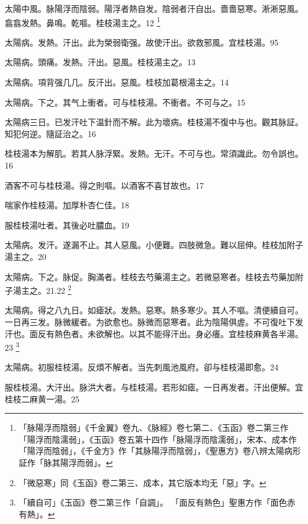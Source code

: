 太陽中風。{\khaaitp 脉}陽浮而陰弱。陽浮者熱自发。陰弱者汗自出。嗇嗇惡寒。淅淅惡風。翕翕发熱。鼻鳴。乾嘔。桂枝湯主之。12
	\footnote{
		「脉陽浮而陰弱」《千金翼》卷九、《脉經》卷七第二、《玉函》卷二第三作「陽浮而陰濡弱」，《玉函》卷五第十四作「脉陽浮而陰濡弱」，宋本、成本作「陽浮而陰弱」，《千金方》作「其脉陽浮而陰弱」，《聖惠方》卷八辨太陽病形証作「脉其陽浮而弱」。
	}

太陽病。发熱。汗出。此为榮弱衛强。故使汗出。欲救邪風。宜桂枝湯。95

太陽病。頭痛。发熱。汗出。惡風。桂枝湯主之。13

太陽病。項背强几几。反汗出。惡風。桂枝{\khaaitp 加葛根}湯主之。14

太陽病。下之。其气上衝者。可与桂枝湯。不衝者。不可与之。15

太陽病三日。已发汗吐下温針而不解。此为壞病。桂枝湯不復中与也。觀其脉証。知犯何逆。隨証治之。16

桂枝湯本为解肌。若其人脉浮緊。发熱。无汗。不可与也。常須識此。勿令誤也。16

酒客不可与桂枝湯。得之則嘔。以酒客不喜甘故也。17

喘家作桂枝湯。加厚朴杏仁佳。18

服桂枝湯吐者。其後必吐膿血。19

太陽病。发汗。遂漏不止。其人惡風。小便難。四肢微急。難以屈伸。桂枝加附子湯主之。20

太陽病。下之。脉促。胸滿者。桂枝去芍藥湯主之。若微{\khaaitp 惡}寒者。桂枝去芍藥加附子湯主之。21.22
	\footnote{
		「微惡寒」同《玉函》卷二第三、成本，其它版本均无「惡」字。
	}

太陽病。得之八九日。如瘧狀。发熱。惡寒。熱多寒少。其人不嘔。清便續自可。一日再三发。脉微緩者。为欲愈也。脉微而惡寒者。此为陰陽俱虗。不可復{\khaaitp 吐下}发汗也。面反有熱色者。未欲解也。以其不能得汗出。身必癢。宜桂枝麻黄各半湯。23
	\footnote{
		「續自可」《玉函》卷二第三作「自調」。
		「面反有熱色」聖惠方作「面色赤有熱」。
	}

太陽病。初服桂枝湯。反煩不解者。当先刺風池風府。卻与桂枝湯即愈。24

服桂枝湯。大汗出。脉洪大者。与桂枝湯。若形如瘧。一日再发者。汗出便解。宜桂枝二麻黄一湯。25

%

